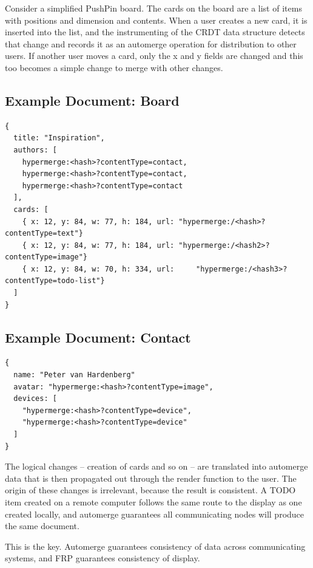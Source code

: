 \documentclass[sigplan,10pt]{acmart}
\begin{document}
Consider a simplified PushPin board. The cards on the board are a list of items with positions and dimension and contents. When a user creates a new card, it is inserted into the list, and the instrumenting of the CRDT data structure detects that change and records it as an automerge operation for distribution to other users. If another user moves a card, only the x and y fields are changed and this too becomes a simple change to merge with other changes.

\subsection{Example Document: Board}
\begin{verbatim}
{
  title: "Inspiration",
  authors: [
    hypermerge:<hash>?contentType=contact,     
    hypermerge:<hash>?contentType=contact,
    hypermerge:<hash>?contentType=contact
  ],
  cards: [
    { x: 12, y: 84, w: 77, h: 184, url: "hypermerge:/<hash>?contentType=text"}
    { x: 12, y: 84, w: 77, h: 184, url: "hypermerge:/<hash2>?contentType=image"}
    { x: 12, y: 84, w: 70, h: 334, url:     "hypermerge:/<hash3>?contentType=todo-list"}
  ]
}
\end{verbatim}

\subsection{Example Document: Contact}
\begin{verbatim}
{
  name: "Peter van Hardenberg"
  avatar: "hypermerge:<hash>?contentType=image",
  devices: [
    "hypermerge:<hash>?contentType=device",
    "hypermerge:<hash>?contentType=device"
  ]
}

\end{verbatim}


The logical changes -- creation of cards and so on -- are translated into automerge data that is then propagated out through the render function to the user. The origin of these changes is irrelevant, because the result is consistent. A TODO item created on a remote computer follows the same route to the display as one created locally, and automerge guarantees all communicating nodes will produce the same document.

This is the key. Automerge guarantees consistency of data across communicating systems, and FRP guarantees consistency of display.

\end{document}
